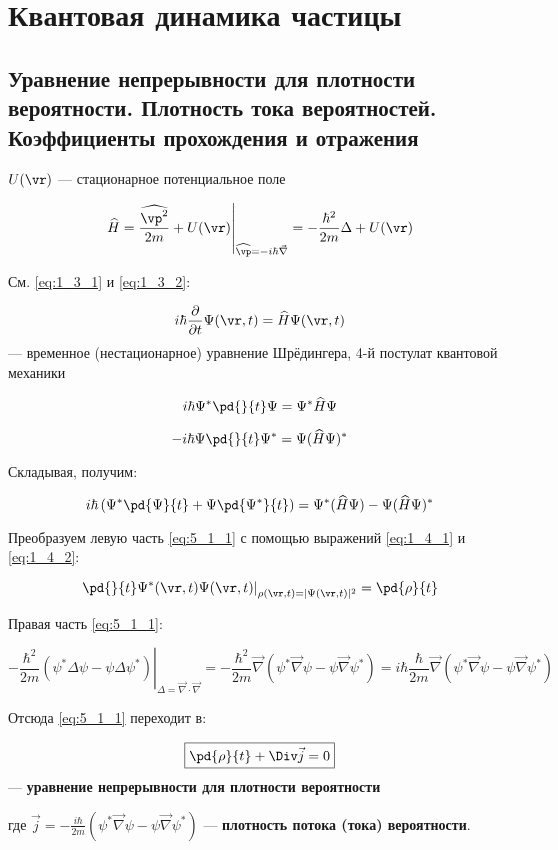 \chapter{Квантовая динамика частицы}

\section{Уравнение непрерывности для плотности вероятности. Плотность тока вероятностей. Коэффициенты прохождения и отражения}

$U(\vr)$ --- стационарное потенциальное поле

$$\left. \widehat{H}=\frac{\widehat{\vp^2}}{2m}+U(\vr) \right|_{\widehat{\vp}=-i\hbar\vec{\nabla}} =-\frac{\hbar^2}{2m}\Delta+U(\vr)$$

См. \eqref{eq:1_3_1} и \eqref{eq:1_3_2}:

$$i\hbar\frac{\partial}{\partial{t}}\Psi(\vr,t)=\widehat{H}\Psi(\vr,t)$$
--- временное (нестационарное) уравнение Шрёдингера, 4-й постулат квантовой механики

$$i\hbar\Psi^*\pd{}{t}\Psi=\Psi^*\widehat{H}\Psi$$

$$-i\hbar\Psi\pd{}{t}\Psi^*=\Psi(\widehat{H}\Psi)^*$$

Складывая, получим:

\begin{equation}
\label{eq:5_1_1}
i\hbar\left(\Psi^*\pd{\Psi}{t}+\Psi\pd{\Psi^*}{t}\right)=\Psi^*(\widehat{H}\Psi)-\Psi(\widehat{H}\Psi)^*
\end{equation}

Преобразуем левую часть \eqref{eq:5_1_1} с помощью выражений \eqref{eq:1_4_1} и \eqref{eq:1_4_2}:

$$\left.\pd{}{t}\Psi^*(\vr,t)\Psi(\vr,t)\right|_{\rho(\vr,t)=|\Psi(\vr,t)|^2} =\pd{\rho}{t}$$


Правая часть \eqref{eq:5_1_1}: 

$$\left. -\frac{\hbar^2}{2m}(\psi^*\Delta\psi-\psi\Delta\psi^*)\right|_{\Delta=\vec{\nabla}\cdot\vec{\nabla}} =-\frac{\hbar^2}{2m}\vec{\nabla}(\psi^*\vec{\nabla}\psi-\psi\vec{\nabla}\psi^*) = i\hbar\frac{\hbar}{2m}\vec{\nabla}(\psi^*\vec{\nabla}\psi-\psi\vec{\nabla}\psi^*)$$

Отсюда \eqref{eq:5_1_1} переходит в:

$$\boxed{\pd{\rho}{t}+\Div\vec{j}=0}$$ --- \textbf{уравнение непрерывности для плотности вероятности}

где $\boxed{\vec{j}=-\frac{i\hbar}{2m}(\psi^*\vec{\nabla}\psi-\psi\vec{\nabla}\psi^*)}$ --- \textbf{плотность потока (тока) вероятности}.

